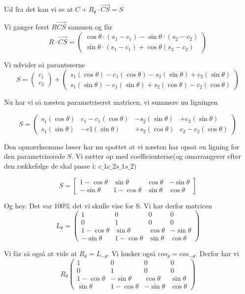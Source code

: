 \documentclass[11pt]{article}
\begin{document}
    Ud fra det kan vi se at \(C + R_\theta\cdot \vec{CS} = S\)

    Vi ganger først \(R \vec{CS}\) sammen og får \[ R\cdot \vec{CS} = 
\begin{pmatrix}
    \cos\theta\cdot(s_1 - c_1) - \sin\theta \cdot(s_2-c_2)\\
    \sin\theta\cdot(s_1 - c_1) + \cos\theta (s_2-c_2)
\end{pmatrix}
\]

    Vi udvider så paranteserne
\[ S = \begin{pmatrix}c_1\\ c_2\end{pmatrix} +
\begin{pmatrix} 
s_1(\cos\theta)- c_1(\cos\theta) -s_2(\sin\theta) + c_2(\sin\theta)\\
s_1(\sin\theta)-c_1(\sin\theta) + s_2(\cos\theta) -c_2(\cos\theta)
\end{pmatrix}
\]

    Nu har vi så næsten parametriseret matricen, vi summere nu ligningen

    \[ S = \begin{pmatrix}
    s_1(\cos\theta)& c_1-c_1(\cos\theta)& -s_2(\sin\theta) & +c_2(\sin\theta)\\
    s_1(\sin\theta)&-c1(\sin\theta)& +s_2(\cos\theta) & c_2 - c_2 (\cos\theta)
    \end{pmatrix}
\]

    Den opmærksomme læser har nu spottet at vi næsten har opsat en ligning
for den parametriserede \(S\). Vi sætter op med coefficienterne(og
omarrangerer efter den rækkefølge de skal passe i: $c\_1 c\_2 s\_1
s\_2)$

    \[
S = \begin{bmatrix}
1-\cos\theta & \sin\theta   & \cos\theta & -\sin\theta\\
-\sin\theta & 1-\cos\theta & \sin\theta & \cos\theta
\end{bmatrix}
\]

    Og hey. Det var 100\% det vi skulle vise for S. Vi har derfor matricen
\[ L_\theta = \begin{pmatrix}1&0&0&0\\0&1&0&0\\
1-\cos\theta & \sin\theta   & \cos\theta & -\sin\theta\\
-\sin\theta & 1-\cos\theta & \sin\theta & \cos\theta
\end{pmatrix}
\]

    Vi får så også at vide at \(R_\theta = L_{-\theta}\). Vi husker også
\(cos_\theta = cos_{-\theta}\). Derfor har vi
\[ R_\theta \begin{pmatrix}1&0&0&0\\0&1&0&0\\
1-\cos\theta & -\sin\theta   & \cos\theta & \sin\theta\\
\sin\theta & 1-\cos\theta & -\sin\theta & \cos\theta
\end{pmatrix}
\]
\end{document}
